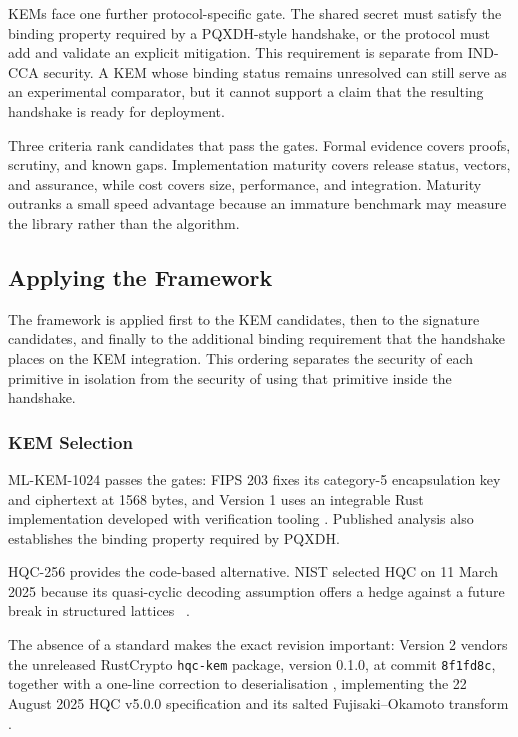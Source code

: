 KEMs face one further protocol-specific gate. The shared secret must satisfy the binding property required by a PQXDH-style handshake, or the protocol must add and validate an explicit mitigation. This requirement is separate from IND-CCA security. A KEM whose binding status remains unresolved can still serve as an experimental comparator, but it cannot support a claim that the resulting handshake is ready for deployment.

Three criteria rank candidates that pass the gates. Formal evidence covers proofs, scrutiny, and known gaps. Implementation maturity covers release status, vectors, and assurance, while cost covers size, performance, and integration. Maturity outranks a small speed advantage because an immature benchmark may measure the library rather than the algorithm.

\subsection{Applying the Framework}
\label{subsec:selection}

The framework is applied first to the KEM candidates, then to the signature candidates, and finally to the additional binding requirement that the handshake places on the KEM integration. This ordering separates the security of each primitive in isolation from the security of using that primitive inside the handshake.

\subsubsection{KEM Selection}
\label{subsubsec:kem-selection}

ML-KEM-1024 passes the gates: FIPS 203 fixes its category-5 encapsulation key and ciphertext at 1568 bytes, and Version 1 uses an integrable Rust implementation developed with verification tooling \cite{national_institute_of_standards_and_technology_us_module-lattice-based_2024-1,noauthor_release_nodate-1}. Published analysis also establishes the binding property required by PQXDH.

HQC-256 provides the code-based alternative. NIST selected HQC on 11 March 2025 because its quasi-cyclic decoding assumption offers a hedge against a future break in structured lattices \cite{alagic_status_2025}~\cite{noauthor_nist_2025}.

The absence of a standard makes the exact revision important: Version 2 vendors the unreleased RustCrypto \texttt{hqc-kem} package, version 0.1.0, at commit \texttt{8f1fd8c}, together with a one-line correction to deserialisation \cite{noauthor_kemshqc-kem_nodate}, implementing the 22 August 2025 HQC v5.0.0 specification and its salted Fujisaki--Okamoto transform \cite{aguilar-melchor_hqc_nodate}.


